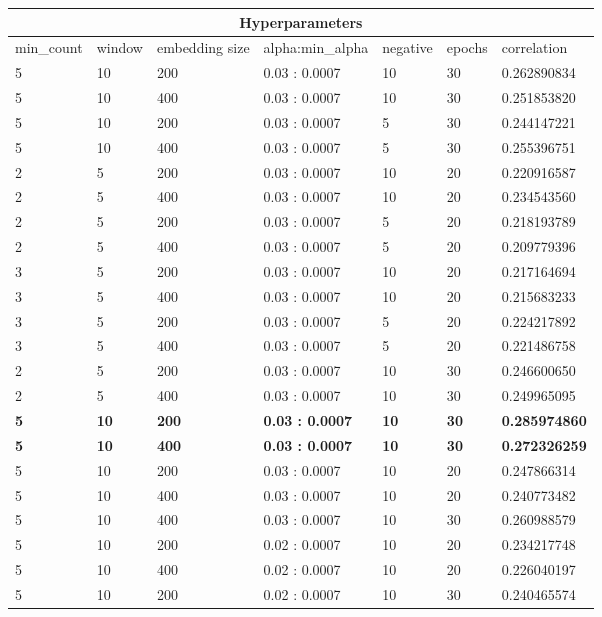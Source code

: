 \documentclass[paper=a4, fontsize=10pt, oneside]{scrartcl}
\begin{document}
\begin{table}
\begin{tabular}{ |p{1.4cm}|p{1cm}|p{2.4cm}|p{2.4cm}|p{1.3cm}|p{1cm}|p{2cm}|}
 \hline
 \multicolumn{7}{|c|}{Hyperparameters} \\
 \hline
 min_count& window& embedding size& alpha:min\_alpha& negative& epochs& correlation\\

 \hline

5 &10 &200 &0.03 : 0.0007 &10 &30 &0.262890834 \\
5 &10 &400 &0.03 : 0.0007 &10 &30 &0.251853820 \\
5 &10 &200 &0.03 : 0.0007 &5 &30 &0.244147221 \\
5 &10 &400 &0.03 : 0.0007 &5 &30 &0.255396751 \\
2 &5 &200 &0.03 : 0.0007 &10 &20 &0.220916587 \\
2 &5 &400 &0.03 : 0.0007 &10 &20 &0.234543560 \\
2 &5 &200 &0.03 : 0.0007 &5 &20 &0.218193789 \\
2 &5 &400 &0.03 : 0.0007 &5 &20 &0.209779396 \\
3 &5 &200 &0.03 : 0.0007 &10 &20 &0.217164694 \\
3 &5 &400 &0.03 : 0.0007 &10 &20 &0.215683233 \\
3 &5 &200 &0.03 : 0.0007 &5 &20 &0.224217892 \\
3 &5 &400 &0.03 : 0.0007 &5 &20 &0.221486758 \\
2 &5 &200 &0.03 : 0.0007 &10 &30 &0.246600650 \\
2 &5 &400 &0.03 : 0.0007 &10 &30 &0.249965095 \\
\textbf{5} &\textbf{10} &\textbf{200} &\textbf{0.03 : 0.0007} &\textbf{10} &\textbf{30} &\textbf{0.285974860} \\
\textbf{5} &\textbf{10} &\textbf{400} &\textbf{0.03 : 0.0007} &\textbf{10} &\textbf{30} &\textbf{0.272326259} \\
5 &10 &200 &0.03 : 0.0007 &10 &20 &0.247866314 \\
5 &10 &400 &0.03 : 0.0007 &10 &20 &0.240773482 \\
5 &10 &400 &0.03 : 0.0007 &10 &30 &0.260988579 \\
5 &10 &200 &0.02 : 0.0007 &10 &20 &0.234217748 \\
5 &10 &400 &0.02 : 0.0007 &10 &20 &0.226040197 \\
5 &10 &200 &0.02 : 0.0007 &10 &30 &0.240465574 \\

\end{tabular}
\end{table}
\end{document}

